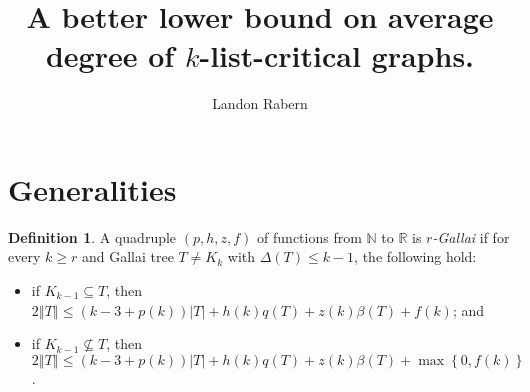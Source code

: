 \documentclass[10pt]{article}
\title{A better lower bound on average degree of $k$-list-critical graphs.}
\author{Landon Rabern}
\theoremstyle{plain}
\theoremstyle{definition}
\newtheorem{defn}{Definition}
\theoremstyle{remark}
\newcommand{\IN}{\mathbb{N}}
\newcommand{\IR}{\mathbb{R}}
\newcommand{\set}[1]{\left\{ #1 \right\}}
\newcommand{\card}[1]{\left|#1\right|}
\newcommand{\size}[1]{\left\Vert#1\right\Vert}
\newcommand{\parens}[1]{\left( #1 \right)}
\begin{document}
\maketitle

\section{Generalities}
\begin{defn}
A quadruple $\parens{p,h,z,f}$ of functions from $\IN$ to $\IR$ is \emph{$r$-Gallai} if for every $k \ge r$ and Gallai tree $T \ne K_k$ with $\Delta(T) \le k-1$,
the following hold:
\begin{itemize}
\item if $K_{k-1} \subseteq T$, then $2\size{T} \le \parens{k-3 + p(k)}\card{T} + h(k)q(T) + z(k)\beta(T) + f(k)$; and
\item if $K_{k-1} \not\subseteq T$, then $2\size{T} \le \parens{k-3 + p(k)}\card{T} + h(k)q(T) + z(k)\beta(T) + \max\set{0, f(k)}$.
\end{itemize}
\end{defn}
\end{document}
